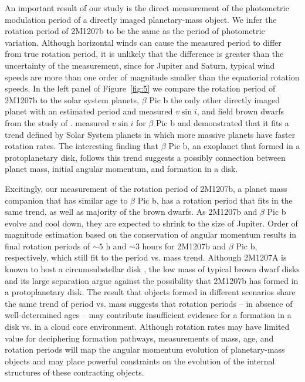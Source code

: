 \documentclass[apj]{emulateapj}
\newcommand{\bpic}{$\beta$ Pic}
\newcommand{\vsini}{$v\sin i$}
\begin{document}
An important result of our study is the direct measurement of the
photometric modulation period of a directly imaged planetary-mass
object. We infer the rotation period of 2M1207b to be the same as the
period of photometric variation. Although horizontal winds can cause
the measured period to differ from true rotation period, it is
unlikely that the difference is greater than the uncertainty of the
measurement, since for Jupiter and Saturn, typical wind speeds are
more than one order of magnitude smaller than the equatorial rotation
speeds.  In the left panel of Figure~\ref{fig:5} we compare the
rotation period of 2M1207b to the solar system planets, \bpic{} b the
only other directly imaged planet with an estimated period and
measured \vsini, and field brown dwarfs from the study of
\cite[][]{Metchev2015}. \citet[][]{Snellen2014} measured \vsini{} for
\bpic{} b and demonstrated that it fits a trend defined by Solar
System planets in which more massive planets have faster rotation
rates. The interesting finding that \bpic{} b, an exoplanet that
formed in a protoplanetary disk, follows this trend suggests a
possibly connection between planet mass, initial angular momentum, and
formation in a disk.

Excitingly, our measurement of the rotation period of 2M1207b, a
planet mass companion that has similar age to \bpic{} b, has a
rotation period that fits in the same trend, as well as majority of
the brown dwarfs. As 2M1207b and \bpic{} b evolve and cool down, they are
expected to shrink to the size of Jupiter. Order of magnitude
estimation based on the conservation of angular momentum results in
final rotation periods of $\sim 5$ h and $\sim 3$ hours
\citep{Snellen2014} for 2M1207b and \bpic{} b, respectively, which
still fit to the period vs. mass trend. Although 2M1207A is known to
host a circumsubstellar disk \citep{Sterzik2004}, the low mass of
typical brown dwarf disks \citep[e.g.]{Klein2003, Mohanty2013} and its
large separation argue against the possibility that 2M1207b has formed
in a protoplanetary disk.  The result that objects formed in different
scenarios share the same trend of period vs. mass suggests that
rotation periods -- in absence of well-determined ages -- may
contribute insufficient evidence for a formation in a disk vs. in a
cloud core environment. Although rotation rates may have limited value
for deciphering formation pathways, measurements of mass, age, and
rotation periods will map the angular momentum evolution of
planetary-mass objects and may place powerful constraints on the
evolution of the internal structures of these contracting objects.
\end{document}
